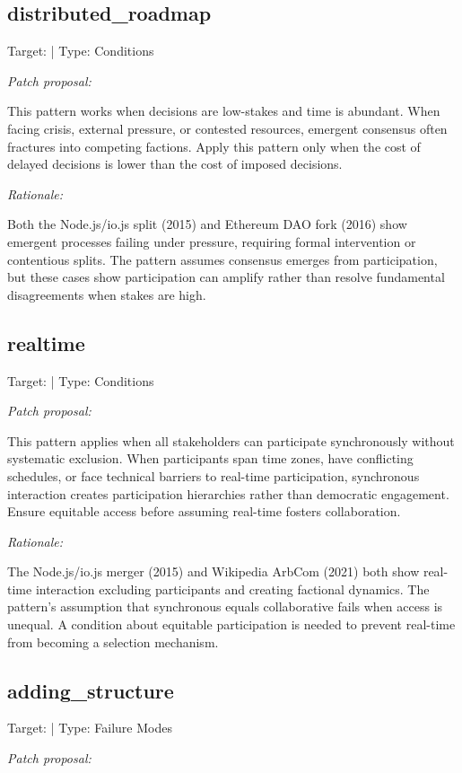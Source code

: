 \documentclass[11pt,a4paper]{article}
\begin{document}
\subsection{distributed\_roadmap}
Target: \texttt{} | Type: Conditions

\textit{Patch proposal:}

This pattern works when decisions are low-stakes and time is abundant. When facing crisis, external pressure, or contested resources, emergent consensus often fractures into competing factions. Apply this pattern only when the cost of delayed decisions is lower than the cost of imposed decisions.

\textit{Rationale:}

Both the Node.js/io.js split (2015) and Ethereum DAO fork (2016) show emergent processes failing under pressure, requiring formal intervention or contentious splits. The pattern assumes consensus emerges from participation, but these cases show participation can amplify rather than resolve fundamental disagreements when stakes are high.

\subsection{realtime}
Target: \texttt{} | Type: Conditions

\textit{Patch proposal:}

This pattern applies when all stakeholders can participate synchronously without systematic exclusion. When participants span time zones, have conflicting schedules, or face technical barriers to real-time participation, synchronous interaction creates participation hierarchies rather than democratic engagement. Ensure equitable access before assuming real-time fosters collaboration.

\textit{Rationale:}

The Node.js/io.js merger (2015) and Wikipedia ArbCom (2021) both show real-time interaction excluding participants and creating factional dynamics. The pattern's assumption that synchronous equals collaborative fails when access is unequal. A condition about equitable participation is needed to prevent real-time from becoming a selection mechanism.

\subsection{adding\_structure}
Target: \texttt{} | Type: Failure Modes

\textit{Patch proposal:}
\end{document}
